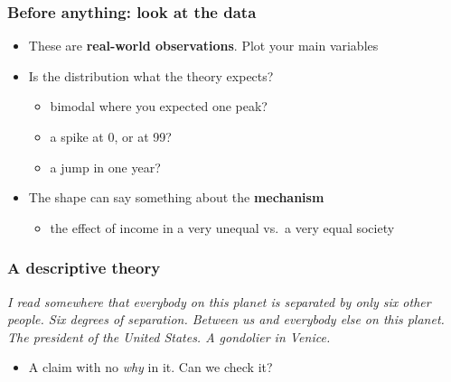 \begin{frame}
\frametitle{Before anything: look at the data}
\centering

\begin{itemize}
  \item These are \textbf{real-world observations}. Plot your main variables
  \vspace{6pt}
  \item Is the distribution what the theory expects?
  \begin{itemize}
    \item bimodal where you expected one peak?
    \item a spike at 0, or at 99?
    \item a jump in one year?
  \end{itemize}
  \vspace{6pt}
  \item<2-> The shape can say something about the \textbf{mechanism}
  \begin{itemize}
    \item<2-> the effect of income in a very unequal vs.\ a very equal society
  \end{itemize}
\end{itemize}

\end{frame}

\begin{frame}
\frametitle{A descriptive theory}
\centering

\vspace{10pt}
\textit{I read somewhere that everybody on this planet is separated by only six other people. Six degrees of separation. Between us and everybody else on this planet. The president of the United States. A gondolier in Venice.}\\

\vspace{20pt}
\begin{itemize}
  \item A claim with no \textit{why} in it. Can we check it?
\end{itemize}

\end{frame}

